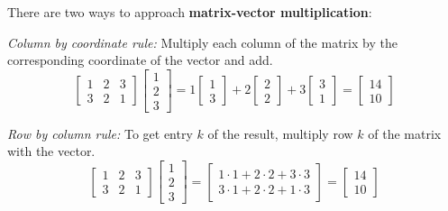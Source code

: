 \begin{definition}
There are two ways to approach \textbf{matrix-vector multiplication}: 

\textit{Column by coordinate rule:} Multiply each column of the matrix by the corresponding coordinate of the vector and add. 
$$\begin{bmatrix}
1 & 2 & 3 \\
3 & 2 & 1
\end{bmatrix} \begin{bmatrix}
1 \\
2 \\
3
\end{bmatrix} = 1 \begin{bmatrix}
1 \\
3
\end{bmatrix} + 2 \begin{bmatrix}
2 \\
2
\end{bmatrix} + 3 \begin{bmatrix}
3 \\
1
\end{bmatrix} = \begin{bmatrix}
14 \\
10
\end{bmatrix}$$

\textit{Row by column rule:} To get entry $k$ of the result, multiply row $k$ of the matrix with the vector. 
$$\begin{bmatrix}
1 & 2 & 3 \\
3 & 2 & 1
\end{bmatrix} \begin{bmatrix}
1 \\
2 \\ 
3
\end{bmatrix} = \begin{bmatrix}
1 \cdot 1 + 2 \cdot 2 + 3 \cdot 3 \\
3 \cdot 1 + 2 \cdot 2 + 1 \cdot 3
\end{bmatrix} = \begin{bmatrix}
14 \\
10
\end{bmatrix}$$
\end{definition}

